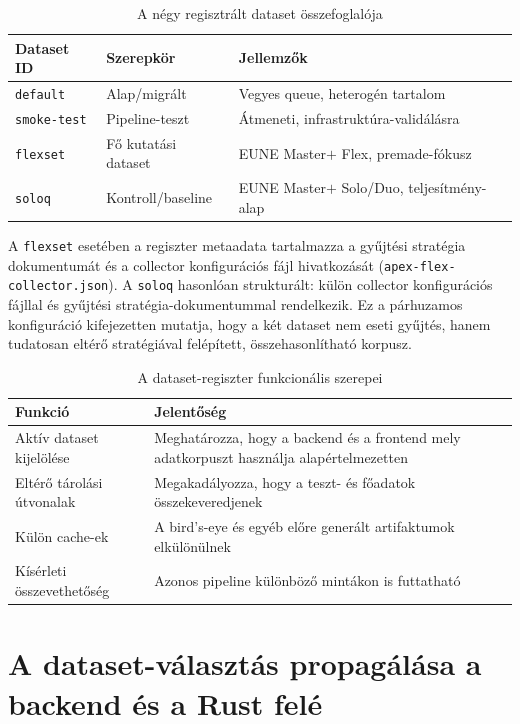 ﻿\documentclass[a4paper,12pt]{report}
\begin{document}
\begin{table}[H]
\centering
\caption{A négy regisztrált dataset összefoglalója}
\begin{tabularx}{\textwidth}{>{\raggedright\arraybackslash}p{3.0cm} >{\raggedright\arraybackslash}p{3.0cm} X}
\toprule
\textbf{Dataset ID} & \textbf{Szerepkör} & \textbf{Jellemzők} \\
\midrule
\texttt{default} & Alap/migrált & Vegyes queue, heterogén tartalom \\
\texttt{smoke-test} & Pipeline-teszt & Átmeneti, infrastruktúra-validálásra \\
\texttt{flexset} & Fő kutatási dataset & EUNE Master$+$ Flex, premade-fókusz \\
\texttt{soloq} & Kontroll/baseline & EUNE Master$+$ Solo/Duo, teljesítmény-alap \\
\bottomrule
\end{tabularx}
\end{table}

A \texttt{flexset} esetében a regiszter metaadata tartalmazza a gyűjtési stratégia dokumentumát és a collector konfigurációs fájl hivatkozását (\texttt{apex\allowbreak-flex\allowbreak-collector.json}). A \texttt{soloq} hasonlóan strukturált: külön collector konfigurációs fájllal és gyűjtési stratégia-dokumentummal rendelkezik. Ez a párhuzamos konfiguráció kifejezetten mutatja, hogy a két dataset nem eseti gyűjtés, hanem tudatosan eltérő stratégiával felépített, összehasonlítható korpusz.

\begin{table}[H]
\centering
\caption{A dataset-regiszter funkcionális szerepei}
\begin{tabularx}{\textwidth}{>{\raggedright\arraybackslash}p{4.2cm}X}
\toprule
\textbf{Funkció} & \textbf{Jelentőség} \\
\midrule
Aktív dataset kijelölése & Meghatározza, hogy a backend és a frontend mely adatkorpuszt használja alapértelmezetten \\
Eltérő tárolási útvonalak & Megakadályozza, hogy a teszt- és főadatok összekeveredjenek \\
Külön cache-ek & A bird's-eye és egyéb előre generált artifaktumok elkülönülnek \\
Kísérleti összevethetőség & Azonos pipeline különböző mintákon is futtatható \\
\bottomrule
\end{tabularx}
\end{table}

\section{A dataset-választás propagálása a backend és a Rust felé}
\end{document}
